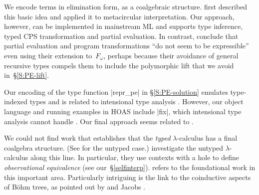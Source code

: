 We encode terms in elimination form, as a coalgebraic structure.
 first described this basic idea and applied it to
metacircular interpretation.
Our approach, however, can be implemented in mainstream ML and supports
type inference, typed CPS transformation and partial evaluation. In contrast,
\citeauthor{Pfenning-Lee} conclude that partial evaluation and program
transformations ``do not seem to be expressible'' even using their
extension to~$F_\omega$, perhaps because their avoidance of general
recursive types compels them to include the polymorphic lift that we
avoid in~\S\ref{S:PE-lift}.
\begin{comment}
It seems that Pfenning and Lee embed $F_2$ with type constructions in 
(pure) $F_3$.  We embed $F_1$ in (weak?) $F_2$, as I see it.  In a way, what 
we do is very similar to what they do (Figure 1, p.152), except that we 
do it in standard programming languages.  It is unclear if their work can 
be implemented (yet) in any language.  And we preserve type-inference, 
while their solution needs explicit types!
The following line of their conclusion is worth citing: "... this does 
not imply that the same language is also suitable for type 
metaprogramming. ... such as partial evaluation... do not seem to be 
expressible".
I suspect you're right, but I'm still reading the paper.  See also page
146: "for a term M in $F_1$ (a simply-typed term), the representation
$\bar{M}$ will be in $F_2$".  The move from $F_2$ to $F_3$ 
and beyond reminds me
strongly of our attempts at self-interpretation without the notion of a
syntactic hole.
\end{comment}

Our encoding of the type function |repr_pe| in \S\ref{S:PE-solution}
emulates type-indexed types and is related to intensional type analysis
\citep{Morrisett-intensional,Generic-Haskell}. However, our object
language and running examples in HOAS include |fix|,
which intensional type analysis cannot handle
\citep{xi-guarded}.  Our final approach
seems related to \citet{Washburn-Weirich-boxes}.


We could not find work that establishes that
the \emph{typed} $\lambda$-calculus has a final coalgebra structure.
\ifshort
(See  for the untyped case.)
\else
{}
investigate the untyped $\lambda$-calculus
along this line.  
In particular, they use
contexts with a hole \citep[p.\,13]{honsell99coinductive} to define
\emph{observational equivalence}
(see our~\S\ref{selfinterp}).
 refers to the
foundational work in this important area.  
Particularly intriguing is the link to the
coinductive aspects of B\"{o}hm trees, as pointed out by
\citet{berarducci-models} and Jacobs \citeyearpar[Example 4.3.4]{jacobs-coalgebra}.
\fi

